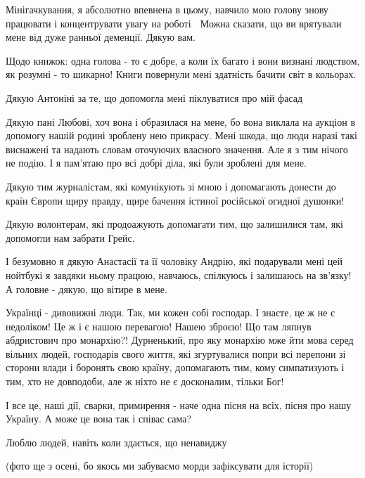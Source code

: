 Мінігачкування, я абсолютно впевнена в цьому, навчило мою голову знову
працювати і концентрувати увагу на роботі 🙂 Можна сказати, що ви врятували
мене від дуже ранньої деменції. Дякую вам.

Щодо книжок: одна голова - то є добре, а коли їх багато і вони визнані
людством, як розумні - то шикарно! Книги повернули мені здатність бачити світ в
кольорах.

Дякую Антоніні за те, що допомогла мені піклуватися про мій фасад 🙂

Дякую пані Любові, хоч вона і образилася на мене, бо вона виклала на аукціон в
допомогу нашій родині зроблену нею прикрасу. Мені шкода, що люди наразі такі
виснажені та надають словам оточуючих власного значення. Але я з тим нічого не
подію. І я пам’ятаю про всі добрі діла, які були зроблені для мене.

Дякую тим журналістам, які комунікують зі мною і допомагають донести до країн
Європи щиру правду, щире бачення істиної російської огидної душонки!

Дякую волонтерам, які продоажують допомагати тим, що залишилися там, які
допомогли нам забрати Грейс.

І безумовно я дякую Анастасії та її чоловіку Андрію, які подарували мені цей
нойтбукі я завдяки ньому працюю, навчаюсь, спілкуюсь і залишаюсь на зв’язку! А
головне - дякую, що вітире в мене.

Українці - дивовижні люди. Так, ми кожен собі господар. І знаєте, це ж не є
недоліком! Це ж і є нашою перевагою! Нашею зброєю! Що там ляпнув абдристович
про монархію?! Дурненький, про яку монархію мже йти мова серед вільних людей,
господарів свого життя, які згуртувалися попри всі перепони зі сторони влади і
боронять свою країну, допомагають тим, кому симпатизують і тим, хто не
довподоби, але ж ніхто не є досконалим, тільки Бог!

І все це, наші дії, сварки, примирення - наче одна пісня на всіх, пісня про
нашу Україну. А може це вона так і співає сама?

Люблю людей, навіть коли здається, що ненавиджу 🙂

(фото ще з осені, бо якось ми забуваємо морди зафіксувати для історії)

